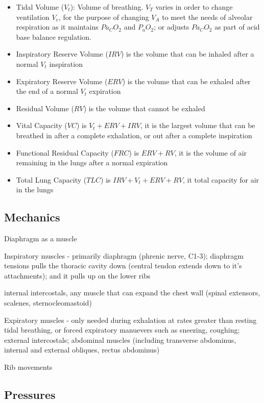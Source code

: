 \begin{itemize}
    \item Tidal Volume ($V_t$): Volume of breathing. $V_T$ varies in order to change ventilation $V_e$, for the purpose of changing $V_A$ to meet the needs of alveolar respiration as it maintains $Pa_CO_2$ and $P_aO_2$; or adjusts $Pa_CO_2$ as part of acid base balance regulation.
    \item Inspiratory Reserve Volume ($IRV$) is the volume that can be inhaled after a normal $V_t$ inspiration
    \item Expiratory Reserve Volume ($ERV$) is the volume that can be exhaled after the end of a normal $V_t$ expiration
    \item Residual Volume ($RV$) is the volume that cannot be exhaled
    \item Vital Capacity ($VC$) is $V_t + ERV + IRV$, it is the largest volume that can be breathed in after a complete exhalation, or out after a complete inspiration
    \item Functional Residual Capacity ($FRC$) is $ERV + RV$, it is the volume of air remaining in the lungs after a normal expiration
    \item Total Lung Capacity ($TLC$) is $IRV + V_t + ERV + RV$, it total capacity for air in the lungs
\end{itemize}



\subsection{Mechanics}

Diaphragm as a muscle


Inspiratory muscles - primarily diaphragm (phrenic nerve, C1-3); diaphragm tensions pulls the thoracic cavity down (central tendon extends down to it's attachments); and it pulls up on the lower ribs


internal intercostals, any muscle that can expand the chest wall (spinal extensors, scalenes, sternocleomastoid)

Expiratory muscles - only needed during exhalation at rates greater than resting tidal breathing, or forced expiratory manuevers such as sneezing, coughing; external intercostals; abdominal muscles (including transverse abdominus, internal and external obliques, rectus abdominus)

Rib movements


\subsection{Pressures}





